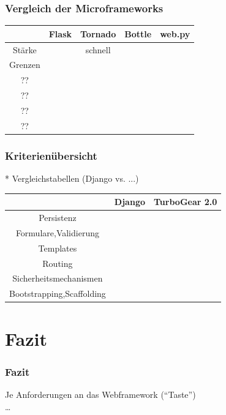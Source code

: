 \documentclass[
    t,
    smaller,
    compress,
    xcolor=svgnames,            %
    table,
]{beamer}
\begin{document}
\begin{frame}
  \frametitle{Vergleich der Microframeworks}

    \begin{table}[h]
        \begin{tabular}{|c|c|c|c|c|}
            \hline
             		& Flask & Tornado & Bottle & web.py \\ \hline
            St\"arke &   &	schnell  &   &      \\ \hline
            Grenzen &   &   &   &      \\ \hline
            ?? &   &   &   &      \\ \hline
            ?? &   &   &   &      \\ \hline
            ?? &   &   &   &      \\ \hline
            ?? &   &   &   &      \\ \hline

         \end{tabular}
    \end{table}

\end{frame}

\begin{frame}
  \frametitle{Kriterienübersicht}
 * Vergleichstabellen (Django vs. ...)

    \begin{table}[h]
        \begin{tabular}{|c|c|c|}
            \hline
             & Django & TurboGear 2.0  \\ \hline
            Persistenz &   &      \\ \hline
            Formulare,Validierung &   &      \\ \hline
            Templates &   &      \\ \hline
            Routing &   &      \\ \hline
            Sicherheitsmechanismen &   &      \\ \hline
            Bootstrapping,Scaffolding &   &      \\ \hline

         \end{tabular}
    \end{table}

\end{frame}


\section{Fazit}
\begin{frame}
  \frametitle{Fazit}

  Je Anforderungen an das Webframework (“Taste”)\\
  \dots

\end{frame}
\end{document}
